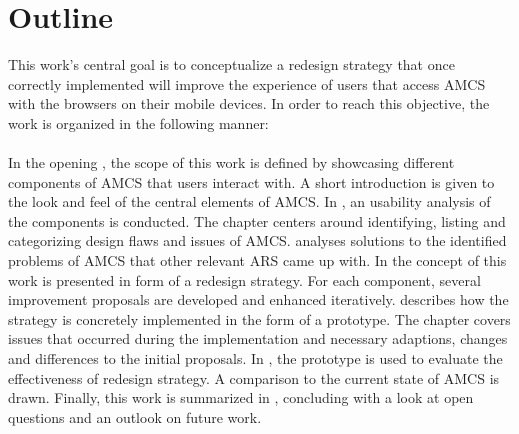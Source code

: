 \section{Outline}
\label{section:intro:objective}
This work's central goal is to conceptualize a redesign strategy that once correctly implemented will improve the experience of users that access AMCS with the browsers on their mobile devices. In order to reach this objective, the work is organized in the following manner:
\\
\\
In the opening , the scope of this work is defined by showcasing different components of AMCS that users interact with. A short introduction is given to the look and feel of the central elements of AMCS.
In , an usability analysis of the components is conducted. The chapter centers around identifying, listing and categorizing design flaws and issues of AMCS. 
 analyses solutions to the identified problems of AMCS that other relevant ARS came up with.
In  the concept of this work is presented in form of a redesign strategy. For each component, several improvement proposals are developed and enhanced iteratively. 
 describes how the strategy is concretely implemented in the form of a prototype. The chapter covers issues that occurred during the implementation and necessary adaptions, changes and differences to the initial proposals.
In , the prototype is used to evaluate the effectiveness of redesign strategy. A comparison to the current state of AMCS is drawn.
Finally, this work is summarized in , concluding with a look at open questions and an outlook on future work.